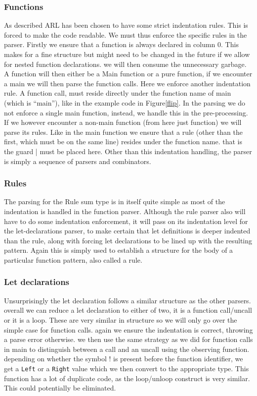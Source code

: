 \documentclass[a4paper]{article}
\begin{document}
\subsubsection{Functions}
\label{sec:orgff77383}
As described ARL has been chosen to have some strict indentation rules. This is forced to make the code readable. We must thus enforce the specific rules in the parser. Firstly we ensure that a function is always declared in column 0. This makes for a fine structure but might need to be changed in the future if we allow for nested function declarations. we will then consume the unnecessary garbage. A function will then either be a Main function or a pure function, if we encounter a main we will then parse the function calls. Here we enforce another indentation rule. A function call, must reside directly under the function name of main (which is ``main''), like in the example code in Figure\ref{flip}. In the parsing we do not enforce a single main function, instead, we handle this in the pre-processing.
If we however encounter a non-main function (from here just function) we will parse its rules. Like in the main function we ensure that a rule (other than the first, which must be on the same line) resides under the function name. that is the guard | must be placed here. Other than this indentation handling, the parser is simply a sequence of parsers and combinators.
\subsubsection{Rules}
\label{sec:orga1127d1}
The parsing for the Rule sum type is in itself quite simple as most of the indentation is handled in the function parser. Although the rule parser also will have to do some indentation enforcement, it will pass on its indentation level for the let-declarations parser, to make certain that let definitions is deeper indented than the rule, along with forcing let declarations to be lined up with the resulting pattern. Again this is simply used to establish a structure for the body of a particular function pattern, also called a rule.
\subsubsection{Let declarations}
\label{sec:org95cf4a2}
Unsurprisingly the let declaration follows a similar structure as the other parsers. overall we can reduce a let declaration to either of two, it is a function call/uncall or it is a loop. These are very similar in structure so we will only go over the simple case for function calls. again we ensure the indentation is correct, throwing a parse error otherwise. we then use the same strategy as we did for function calls in main to distinguish between a call and an uncall using the observing function. depending on whether the symbol ! is present before the function identifier, we get a \texttt{Left} or a \texttt{Right} value which we then convert to the appropriate type.
This function has a lot of duplicate code, as the loop/unloop construct is very similar. This could potentially be eliminated.
\end{document}
